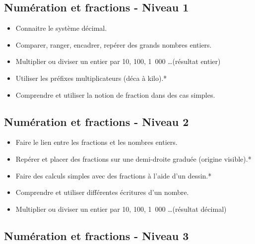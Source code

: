 \documentclass[a4paper,12pt,fleqn]{article}
\begin{document}
\renewcommand{\labelitemi}{}

\subsection*{Numération et fractions - Niveau 1}

\begin{itemize}
	\item {}Connaitre le système décimal.
	\item {}Comparer, ranger, encadrer, repérer des grands nombres entiers.
	\item {}Multiplier ou diviser un entier par 10, 100, 1~000 \ldots (résultat entier)
	\item {}Utiliser les préfixes multiplicateurs (déca à kilo).*
	\item {}Comprendre et utiliser la notion de fraction dans des cas simples.

\end{itemize}

\subsection*{Numération et fractions - Niveau 2}

\begin{itemize}
	\item {}Faire le lien entre les fractions et les nombres entiers.
	\item {}Repérer et placer des fractions sur une demi-droite graduée (origine visible).*
	\item {}Faire des calculs simples avec des fractions à l’aide d’un dessin.*
	\item {}Comprendre et utiliser différentes écritures d’un nombre.
	\item {}Multiplier ou diviser un entier par 10, 100, 1~000 \ldots (résultat décimal)
\end{itemize}

\subsection*{Numération et fractions - Niveau 3}
\end{document}

